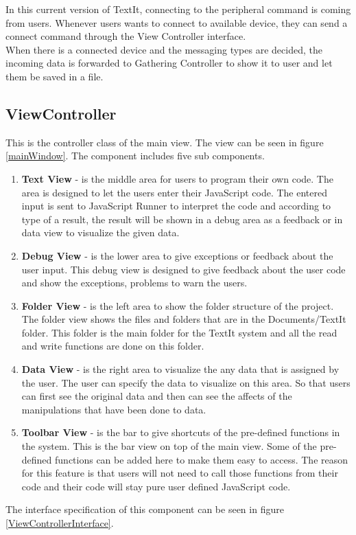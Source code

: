 In this current version of TextIt, connecting to the peripheral command is coming from users. Whenever users wants to connect to available device, they can send a connect command through the View Controller interface. \\

When there is a connected device and the messaging types are decided, the incoming data is forwarded to Gathering Controller to show it to user and let them be saved in a file. 

\subsection{ViewController}
This is the controller class of the main view. The view can be seen in figure \ref{mainWindow}. The component includes five sub components.

\begin{enumerate}
\item \textbf{Text View} - is the middle area for users to program their own code. The area is designed to let the users enter their JavaScript code. The entered input is sent to JavaScript Runner to interpret the code and according to type of a result, the result will be shown in a debug area as a feedback or in data view to visualize the given data. 
\item \textbf{Debug View} - is the lower area to give exceptions or feedback about the user input. This debug view is designed to give feedback about the user code and show the exceptions, problems to warn the users.
\item \textbf{Folder View} - is the left area to show the folder structure of the project. The folder view shows the files and folders that are in the Documents/TextIt folder. This folder is the main folder for the TextIt system and all the read and write functions are done on this folder. 
\item \textbf{Data View} - is the right area to visualize the any data that is assigned by the user. The user can specify the data to visualize on this area. So that users can first see the original data and then can see the affects of the manipulations that have been done to data. 
\item \textbf{Toolbar View} - is the bar to give shortcuts of the pre-defined functions in the system. This is the bar view on top of the main view. Some of the pre-defined functions can be added here to make them easy to access. The reason for this feature is that users will not need to call those functions from their code and their code will stay pure user defined JavaScript code.
\end{enumerate}
The interface specification of this component can be seen in figure \ref{ViewControllerInterface}.

